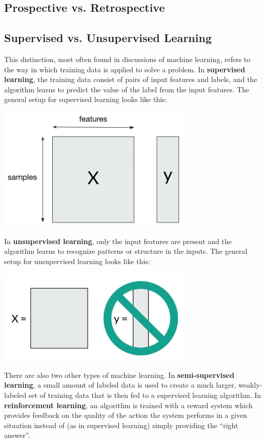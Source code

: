 \subsection{Prospective vs. Retrospective}



\subsection{Supervised vs. Unsupervised Learning}

This distinction, most often found in discussions of machine learning, refers to the way in which training data is applied to solve a problem. In \textbf{supervised learning}, the training data consist of pairs of input features and labels, and the algorithm learns to predict the value of the label from the input features. The general setup for supervised learning looks like this:
\begin{center}
\includegraphics[width=0.7\textwidth]{img/supervised-learning.png}
\end{center}

In \textbf{unsupervised learning}, only the input features are present and the algorithm learns to recognize patterns or structure in the inputs. The general setup for unsupervised learning looks like this:
\begin{center}
\includegraphics[width=0.7\textwidth]{img/unsupervised-learning-diagram.png}
\end{center}

There are also two other types of machine learning. In \textbf{semi-supervised learning}, a small amount of labeled data is used to create a much larger, weakly-labeled set of training data that is then fed to a supervised learning algorithm. In \textbf{reinforcement learning}, an algorithm is trained with a reward system which provides feedback on the quality of the action the system performs in a given situation instead of (as in supervised learning) simply providing the ``right answer''. 





 


